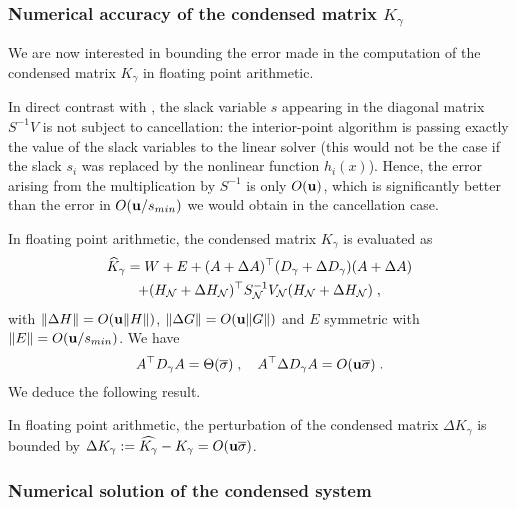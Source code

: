 \subsubsection{Numerical accuracy of the condensed matrix $K_\gamma$}
We are now interested in bounding the error made in
the computation of the condensed matrix $K_\gamma$ in floating
point arithmetic.

In direct contrast with \cite[Section 4.1]{wright1998ill}, the slack variable
$s$ appearing in the diagonal matrix $S^{-1} V$ is not subject to cancellation:
the interior-point algorithm is passing exactly the value of the slack
variables to the linear solver (this would not be the case if the slack
$s_i$ was replaced by the nonlinear function $h_i(x)$). Hence,
the error arising from the multiplication by $S^{-1}$ is only $O(\mathbf{u})$,
which is significantly better than the error in $O(\mathbf{u} / s_{min})$ we would obtain
in the cancellation case.

In floating point arithmetic, the condensed matrix $K_\gamma$ is evaluated as
\begin{multline*}
  \widehat{K}_\gamma = W + E + (A + \Delta A)^\top (D_\gamma + \Delta D_\gamma) (A + \Delta A) \\
  + (H_{\mathcal{N}} + \Delta H_{\mathcal{N}})^\top S_{\mathcal{N}}^{-1} V_{\mathcal{N}} (H_{\mathcal{N}} + \Delta H_{\mathcal{N}}) \; ,
\end{multline*}
with $\| \Delta H \| = O(\mathbf{u} \| H\|)$, $\| \Delta G \| = O(\mathbf{u} \| G\|)$
and $E$ symmetric with $\|E \| = O(\mathbf{u} / s_{min})$.
We have
\begin{equation}
A^\top D_\gamma A = \Theta(\overline{\sigma}) \; , \quad
A^\top \Delta D_\gamma A = O(\mathbf{u} \overline{\sigma}) \; .
\end{equation}
We deduce the following result.
\begin{proposition}
  \label{prop:cond:boundcondensedmatrix}
  In floating point arithmetic, the perturbation
  of the condensed matrix $\Delta K_\gamma$ is bounded by
  $\Delta K_\gamma := \widehat{K_\gamma} - K_\gamma  = O(\mathbf{u} \overline{\sigma})$.
\end{proposition}

\subsubsection{Numerical solution of the condensed system}

